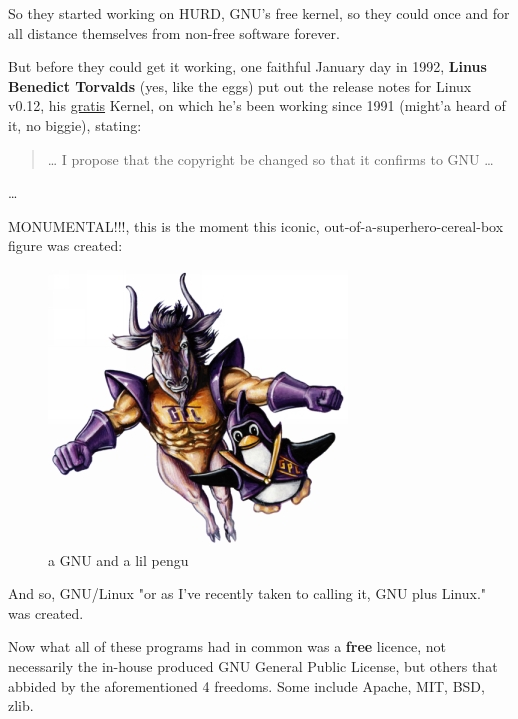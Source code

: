 \documentclass[sigplan,screen]{acmart}
\begin{document}
So they started working on HURD, GNU's free kernel, so they could once and for all distance themselves from non-free software forever. \cite{hurd}

But before they could get it working, one faithful January day in 1992, \textbf{Linus Benedict Torvalds} (yes, like the eggs) put out the release notes for Linux v0.12, his \href{https://www.gnu.org/philosophy/words-to-avoid.en.html#Freemium}{gratis} Kernel, on which he's been working since 1991 (might'a heard of it, no biggie)\cite{linux-init-release-note}, stating:
\begin{quote}
	… I propose that the
	copyright be changed so that it confirms to GNU …
\end{quote}\cite{linux-becomes-free}

\ldots

MONUMENTAL!!!, this is the moment this iconic, out-of-a-superhero-cereal-box figure was created:
\begin{figure}[H]
	\centering
	\includegraphics[width=\columnwidth]{pics/gnu-and-penguin.jpg}
	\caption{a GNU and a lil pengu}
	\label{fig:gnu-linux}
\end{figure}
And so, GNU/Linux "or as I've recently taken to calling it, GNU plus Linux." \cite{gnu-and-linux} was created.

Now what all of these programs had in common was a \textbf{free} licence, not necessarily the in-house produced GNU General Public License, but others that abbided by the aforementioned 4 freedoms. Some include Apache, MIT, BSD, zlib.
\end{document}
